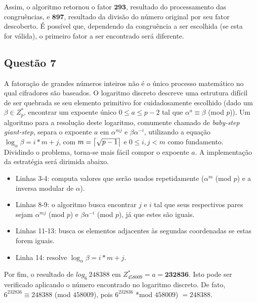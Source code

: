 \documentclass{article}
\DeclarePairedDelimiter{\ceil}{\lceil}{\rceil}
\begin{document}
Assim, o algoritmo retornou o fator $\textbf{293}$, resultado do processamento
das congruências, e $\textbf{897}$, resultado da divisão do número original
por seu fator descoberto. É possível que, dependendo da congruência a ser
escolhida (se esta for válida), o primeiro fator a ser encontrado será
diferente.

\subsection*{Questão 7}

A fatoração de grandes números inteiros não é o único processo matemático no
qual cifradores são baseados. O logaritmo discreto descreve uma estrutura
difícil de ser quebrada se seu elemento primitivo for cuidadosamente escolhido
(dado um $\beta \in Z^{*}_{p}$, encontrar um expoente único $0 \leq a \leq p-2$
tal que $\alpha^{a} \equiv \beta$ (mod $p$)). Um algoritmo para a resolução
deste logaritmo, comumente chamado de \textit{baby-step giant-step}, separa o
expoente $a$ em $\alpha^{mj}$ e $\beta\alpha^{-i}$, utilizando a equação
$\log_{\alpha}\beta = i * m + j$, com $m = \ceil[\big]{\sqrt{p-1}}$ e
$0 \leq i, j < m$ como fundamento. Dividindo o problema, torna-se mais fácil
compor o expoente $a$. A implementação da estratégia será dirimida abaixo.

\begin{itemize}

    

    \item Linhas 3-4: computa valores que serão usados repetidamente
        ($\alpha^{m}$ (mod $p$) e a inversa modular de $\alpha$).

    \item Linhas 8-9: o algoritmo busca encontrar $j$ e $i$ tal que seus
        respectivos pares sejam $\alpha^{mj}$ (mod $p$) e $\beta\alpha^{-i}$
        (mod $p$), já que estes são iguais.

    \item Linhas 11-13: busca os elementos adjacentes às segundas coordenadas
        se estas forem iguais.

    \item Linha 14: resolve $\log_{\alpha}\beta = i * m + j$.

\end{itemize}

Por fim, o resultado de
$log_{6} \: 248388$ em $Z^{*}_{458009} = a = \textbf{232836}$. Isto pode ser
verificado aplicando o número encontrado no logaritmo discreto. De fato,
$6^{232836} \equiv 248388$ (mod $458009$), pois
$6^{232836}$ *mod $458009$) $= 248388$.



\end{document}
